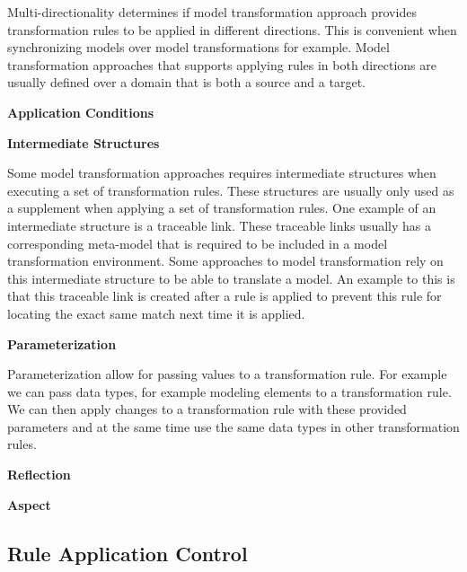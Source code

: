 Multi-directionality determines if model transformation approach provides
transformation rules to be applied in different directions. This is convenient
when synchronizing models over model transformations for example. Model
transformation approaches that supports applying rules in both directions are
usually defined over a domain that is both a source and a target.


\textbf{Application Conditions}

\textbf{Intermediate Structures}

Some model transformation approaches requires intermediate structures when
executing a set of transformation rules. These structures are usually only
used as a supplement when applying a set of transformation rules. One
example of an intermediate structure is a traceable link. These traceable links
usually has a corresponding meta-model that is required to be included in a
model transformation environment. Some approaches to model transformation rely
on this intermediate structure to be able to translate a model. An example to
this is that this traceable link is created after a rule is applied to prevent
this rule for locating the exact same match next time it is applied. 

\textbf{Parameterization}

Parameterization allow for passing values to a transformation rule. For example
we can pass data types, for example modeling elements to a transformation rule.
We can then apply changes to a transformation rule with these provided
parameters and at the same time use the same data types in other
transformation rules.

\textbf{Reflection}

\textbf{Aspect}



\subsection{Rule Application Control}
\label{sec:app_control}

